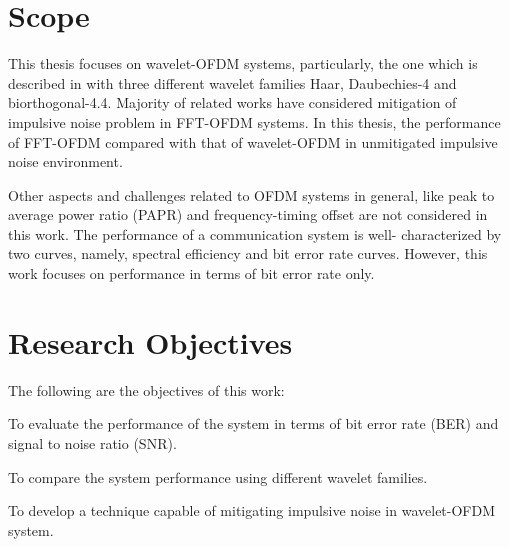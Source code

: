 	\section {Scope}
	 	This thesis focuses on wavelet-OFDM systems, particularly, the one which is described in \cite{2011-abdullah} with three different wavelet families Haar, Daubechies-4 and biorthogonal-4.4. Majority of related works have considered mitigation of  impulsive noise problem in FFT-OFDM systems. In this thesis, the performance of FFT-OFDM compared with that of wavelet-OFDM in unmitigated impulsive noise environment.
		\par Other aspects and challenges related to OFDM systems in general, like peak to average power ratio (PAPR) and frequency-timing offset are not considered in this work. The performance of a communication system is well- characterized by two curves, namely, spectral efficiency and bit error rate curves. However, this work focuses on performance in terms of bit error rate only.
	\section{Research Objectives}
	 	The following are the objectives of this work:
		\begin{compactenum} 
			\item To evaluate the performance of the system in terms of bit error rate (BER) and signal to noise ratio (SNR).
			\item To compare the system performance using different wavelet families.
			\item To develop a technique capable of mitigating impulsive noise in wavelet-OFDM system.
		\end{compactenum}
